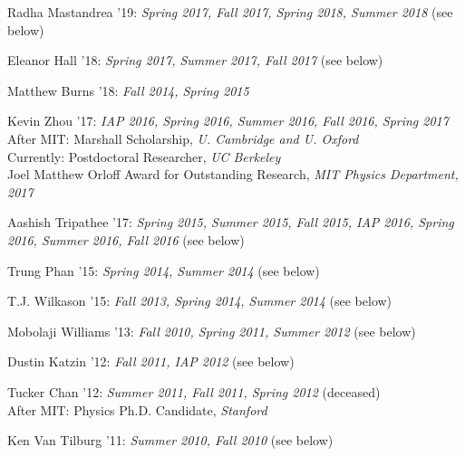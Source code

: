 \item Radha Mastandrea '19: \emph{Spring 2017, Fall 2017, Spring 2018, Summer 2018} (see below) 

\item Eleanor Hall '18: \emph{Spring 2017, Summer 2017, Fall 2017} (see below) 

\item Matthew Burns '18: \emph{Fall 2014, Spring 2015}

\item Kevin Zhou '17: \emph{IAP 2016, Spring 2016, Summer 2016, Fall 2016, Spring 2017}
\\ After MIT: Marshall Scholarship, \emph{U. Cambridge and U. Oxford}
\\ Currently: Postdoctoral Researcher, \emph{UC Berkeley}
\\ Joel Matthew Orloff Award for Outstanding Research, \emph{MIT Physics Department, 2017}

\item Aashish Tripathee '17: \emph{Spring 2015, Summer 2015, Fall 2015, IAP 2016, Spring 2016, Summer 2016, Fall 2016} (see below) 

\item Trung Phan '15: \emph{Spring 2014, Summer 2014} (see below) 

\item T.J. Wilkason '15: \emph{Fall 2013, Spring 2014, Summer 2014} (see below) 

\item Mobolaji Williams '13: \emph{Fall 2010, Spring 2011, Summer 2012} (see below) 

\item Dustin Katzin '12: \emph{Fall 2011, IAP 2012} (see below) 

\item Tucker Chan '12: \emph{Summer 2011, Fall 2011, Spring 2012} (deceased) 
\\ After MIT: Physics Ph.D. Candidate, \emph{Stanford}

\item Ken Van Tilburg '11: \emph{Summer 2010, Fall 2010} (see below) 

\el
